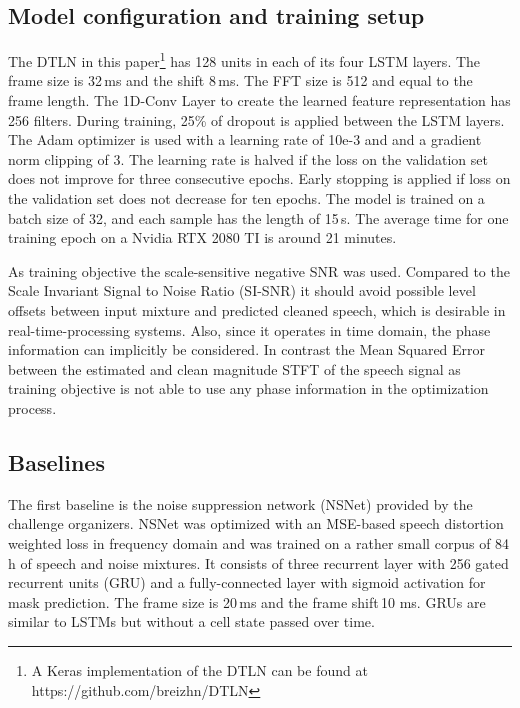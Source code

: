 \documentclass[a4paper]{article}
\begin{document}
\subsection{Model configuration and training setup}
The DTLN in this paper\footnote{A Keras implementation of the DTLN can be found at https://github.com/breizhn/DTLN} has 128 units in each of its four LSTM layers. The frame size is 32\,ms and the shift 8\,ms. The FFT size is 512 and equal to the frame length. The 1D-Conv Layer to create the learned feature representation has 256 filters. During training, 25\% of dropout is applied between the LSTM layers. The Adam optimizer is used with a learning rate of 10e-3 and and a gradient norm clipping of 3. The learning rate is halved if the loss on the validation set does not improve for three consecutive epochs. Early stopping is applied if loss on the validation set does not decrease for ten epochs. The model is trained on a batch size of 32, and each sample has the length of 15\,s. The average time for one training epoch on a Nvidia RTX 2080 TI is around 21 minutes. 

As training objective the scale-sensitive negative SNR \cite{kavalerov2019universal} was used.
Compared to the Scale Invariant Signal to Noise Ratio (SI-SNR) \cite{luo2018tasnet} it should avoid possible level offsets between input mixture and predicted cleaned speech, which is desirable in real-time-processing systems.
Also, since it operates in time domain, the phase information can implicitly be considered. In contrast the Mean Squared Error between the estimated and clean magnitude STFT of the speech signal as training objective is not able to use any phase information in the optimization process.

\subsection{Baselines}
The first baseline is the noise suppression network (NSNet) provided by the challenge organizers. NSNet was optimized with an MSE-based speech distortion weighted loss in frequency domain and was trained on a rather small corpus of 84\,h of speech and noise mixtures. It consists of three recurrent layer with 256 gated recurrent units (GRU) \cite{chung2014gru} and a fully-connected layer with sigmoid activation for mask prediction. The frame size is 20\,ms and the frame shift\,10 ms. GRUs are similar to LSTMs but without a cell state passed over time. 
\end{document}
